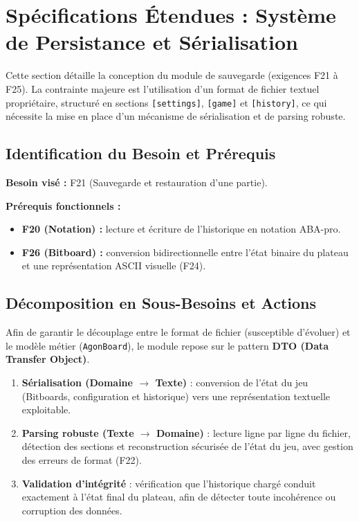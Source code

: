 \documentclass[9pt]{extarticle} %
\begin{document}
\section{Spécifications Étendues : Système de Persistance et Sérialisation}

Cette section détaille la conception du module de sauvegarde (exigences F21 à F25).
La contrainte majeure est l’utilisation d’un format de fichier textuel propriétaire,
structuré en sections \texttt{[settings]}, \texttt{[game]} et \texttt{[history]},
ce qui nécessite la mise en place d’un mécanisme de sérialisation et de parsing robuste.

\subsection{Identification du Besoin et Prérequis}
\textbf{Besoin visé :} F21 (Sauvegarde et restauration d’une partie).

\textbf{Prérequis fonctionnels :}
\begin{itemize}
    \item \textbf{F20 (Notation) :} lecture et écriture de l’historique en notation ABA-pro.
    \item \textbf{F26 (Bitboard) :} conversion bidirectionnelle entre l’état binaire du plateau
    et une représentation ASCII visuelle (F24).
\end{itemize}

\subsection{Décomposition en Sous-Besoins et Actions}
Afin de garantir le découplage entre le format de fichier (susceptible d’évoluer)
et le modèle métier (\texttt{AgonBoard}), le module repose sur le pattern
\textbf{DTO (Data Transfer Object)}.

\begin{enumerate}
    \item \textbf{Sérialisation (Domaine $\rightarrow$ Texte)} :  
    conversion de l’état du jeu (Bitboards, configuration et historique)
    vers une représentation textuelle exploitable.

    \item \textbf{Parsing robuste (Texte $\rightarrow$ Domaine)} :  
    lecture ligne par ligne du fichier, détection des sections et reconstruction
    sécurisée de l’état du jeu, avec gestion des erreurs de format (F22).

    \item \textbf{Validation d’intégrité} :  
    vérification que l’historique chargé conduit exactement à l’état final du plateau,
    afin de détecter toute incohérence ou corruption des données.
\end{enumerate}
\end{document}
